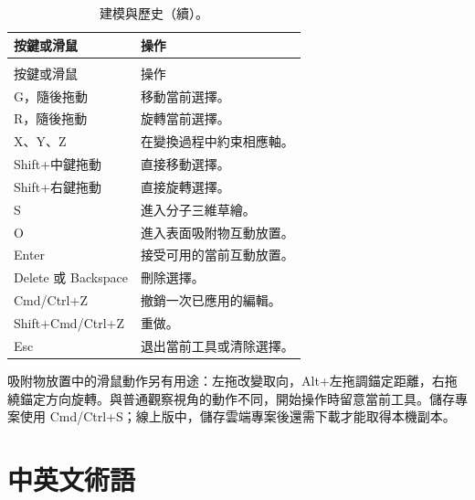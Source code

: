 \begin{longtable}{>{\raggedright\arraybackslash}p{.37\linewidth}>{\raggedright\arraybackslash}p{}}
\caption{建模與歷史。}\\
\toprule
按鍵或滑鼠 & 操作 \\
\midrule
\endfirsthead
\caption[]{建模與歷史（續）。}\\
\toprule
按鍵或滑鼠 & 操作 \\
\midrule
\endhead
\bottomrule
\endfoot
\bottomrule
\endlastfoot
G，隨後拖動 & 移動當前選擇。\\
R，隨後拖動 & 旋轉當前選擇。\\
X、Y、Z & 在變換過程中約束相應軸。\\
Shift+中鍵拖動 & 直接移動選擇。\\
Shift+右鍵拖動 & 直接旋轉選擇。\\
S & 進入分子三維草繪。\\
O & 進入表面吸附物互動放置。\\
Enter & 接受可用的當前互動放置。\\
Delete 或 Backspace & 刪除選擇。\\
Cmd/Ctrl+Z & 撤銷一次已應用的編輯。\\
Shift+Cmd/Ctrl+Z & 重做。\\
Esc & 退出當前工具或清除選擇。\\
\end{longtable}

吸附物放置中的滑鼠動作另有用途：左拖改變取向，Alt+左拖調錨定距離，右拖繞錨定方向旋轉。與普通觀察視角的動作不同，開始操作時留意當前工具。儲存專案使用 Cmd/Ctrl+S；線上版中，儲存雲端專案後還需下載才能取得本機副本。

\Needspace{145mm}
\section{中英文術語}

